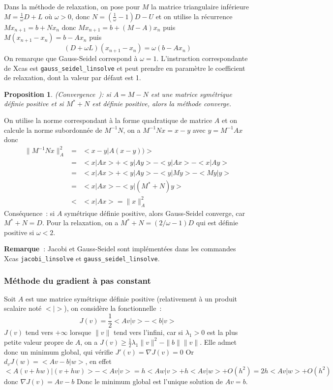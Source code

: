 \documentclass[a4paper,11pt]{article}
\newtheorem{prop}[thm]{Proposition}
\begin{document}
\begin{giacjshere}
Dans la m\'ethode de relaxation, on pose pour $M$ la matrice triangulaire
inf\'erieure $M=\frac1\omega D+L$ o\`u $\omega >0$, donc
$N=(\frac1\omega-1) D-U$
et on utilise la r\'ecurrence $Mx_{n+1}=b+Nx_n$ donc
$Mx_{n+1}=b+(M-A)x_n$ puis
$M(x_{n+1}-x_n)=b-Ax_n$ puis
$$ (D+\omega L) (x_{n+1}-x_n) = \omega(b-Ax_n)$$
On remarque que Gauss-Seidel correspond \`a $\omega=1$.
L'instruction correspondante de Xcas est \verb|gauss_seidel_linsolve| et
peut prendre en param\`etre le coefficient de relaxation, 
dont la valeur par d\'efaut est 1.

\begin{prop} (Convergence~): 
si $A=M-N$ est une matrice sym\'etrique d\'efinie positive
et si $M^*+N$ est d\'efinie positive, alors la m\'ethode converge. 
\end{prop}
On utilise la norme correspondant \`a
la forme quadratique de matrice $A$ et on calcule la norme subordonn\'ee
de $M^{-1}N$, on a $ M^{-1}Nx=x-y$ avec $y=M^{-1}Ax$ donc 
\begin{eqnarray*} 
\| M^{-1}Nx \|^2_A&=&<x-y|A (x-y))> \\
&=&<x|Ax>+<y|Ay>-<y|Ax>-<x|Ay> \\
&=&<x|Ax>+<y|Ay>-<y|My> -<My|y>\\
&=&<x|Ax>-<y|(M^*+N)y>\\
& < & <x|Ax>=\|x\|_A^2
\end{eqnarray*}
Cons\'equence~: si $A$ sym\'etrique d\'efinie positive, alors 
Gauss-Seidel converge, car $M^*+N=D$. Pour la relaxation,
on a $M^*+N=(2/\omega -1)D$ qui est d\'efinie positive si $\omega<2$.

{\bf Remarque~}: Jacobi et Gauss-Seidel sont impl\'ement\'ees dans les commandes
Xcas {\tt jacobi\_linsolve} et {\tt gauss\_seidel\_linsolve}.

\subsubsection{M\'ethode du gradient \`a pas constant}
Soit $A$ est une matrice sym\'etrique d\'efinie positive (relativement
\`a un produit scalaire not\'e $<|>$), on
consid\`ere la fonctionnelle~:
$$ J(v)=\frac{1}{2} <Av|v>-<b|v>$$
$J(v)$ tend vers $+\infty$ lorsque $\|v\|$ tend vers l'infini, 
car si $\lambda_1>0$ est la plus petite valeur propre de $A$,
on a $J(v)\geq \frac{1}{2} \lambda_1 \|v\|^2-\|b\|\|v\|$.
Elle admet donc un minimum global, qui v\'erifie $J'(v)=\nabla J(v)=0$
Or $d_vJ(w)=<Av-b|w>$, en effet
$$<A(v+hw)|(v+hw)>-<Av|v>=h<Aw|v>+h<Av|w>+O(h^2)=2h<Av|w>+O(h^2)$$
donc $\nabla J (v)=Av-b$
Donc le minimum global est l'unique solution de $Av=b$.


\end{giacjshere}
\end{document}
